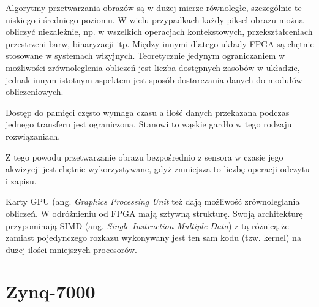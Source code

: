 Algorytmy przetwarzania obrazów są w dużej mierze równoległe, szczególnie te niskiego i średniego poziomu. W wielu przypadkach każdy piksel obrazu można obliczyć niezależnie, np. w wszelkich operacjach kontekstowych, przekształceniach przestrzeni barw, binaryzacji itp. Między innymi dlatego układy FPGA są chętnie stosowane w systemach wizyjnych. Teoretycznie jedynym ograniczaniem w możliwości zrównoleglenia obliczeń jest liczba dostępnych zasobów w układzie, jednak innym istotnym aspektem jest sposób dostarczania danych do modułów obliczeniowych. 

Dostęp do pamięci często wymaga czasu a ilość danych przekazana podczas jednego transferu jest ograniczona. Stanowi to wąskie gardło w tego rodzaju rozwiązaniach.

Z tego powodu przetwarzanie obrazu bezpośrednio z sensora w czasie jego akwizycji jest chętnie wykorzystywane, gdyż zmniejsza to liczbę operacji odczytu i zapisu. \cite{garcia2014survey}

Karty GPU (ang. \textit{Graphics Processing Unit} też dają możliwość zrównoleglania obliczeń. W odróżnieniu od FPGA mają sztywną strukturę. Swoją architekturę przypominają SIMD (ang. \textit{Single Instruction Multiple Data}) z tą różnicą że zamiast pojedynczego rozkazu wykonywany jest ten sam kodu (tzw. kernel) na dużej ilości mniejszych procesorów.



\section{Zynq-7000}

